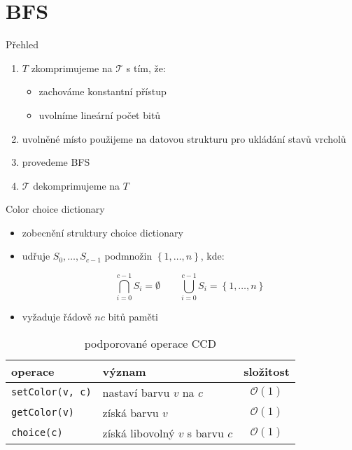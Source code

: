 \documentclass{beamer}
\begin{document}
	\section{BFS}
	\begin{frame}{Přehled}
		\begin{enumerate}
			\item $T$ zkomprimujeme na $\mathcal{T}$ s tím, že:
			\begin{itemize}
				\item zachováme konstantní přístup
				\item uvolníme lineární počet bitů
			\end{itemize}
			\item uvolněné místo použijeme na datovou strukturu pro ukládání stavů vrcholů
			\item provedeme BFS
			\item $\mathcal{T}$ dekomprimujeme na $T$
		\end{enumerate}
	\end{frame}

	\begin{frame}{Color choice dictionary}
		\begin{itemize}
			\item zobecnění struktury choice dictionary
			\item udřuje $S_0, \ldots, S_{c - 1}$ podmnožin $\left\{1, \ldots, n\right\}$, kde:

				$$\bigcap_{i=0}^{c-1} S_i = \emptyset \qquad\bigcup_{i=0}^{c-1} S_i = \left\{1, \ldots, n\right\}$$

			\item vyžaduje řádově $nc$ bitů paměti
		\end{itemize}

		\vfill

		\begin{table}
			\centering
			\begin{tabular}{llc}
				\toprule
				operace & význam & složitost \\
				\midrule
				\texttt{setColor(v, c)} & nastaví barvu $v$ na $c$        & $\mathcal{O}\left(1\right)$ \\
				\texttt{getColor(v)}    & získá barvu $v$                 & $\mathcal{O}\left(1\right)$ \\
				\texttt{choice(c)}      & získá libovolný $v$ s barvu $c$ & $\mathcal{O}\left(1\right)$ \\
				\bottomrule
			\end{tabular}
			\caption{podporované operace CCD}
		\end{table}
	\end{frame}
\end{document}

